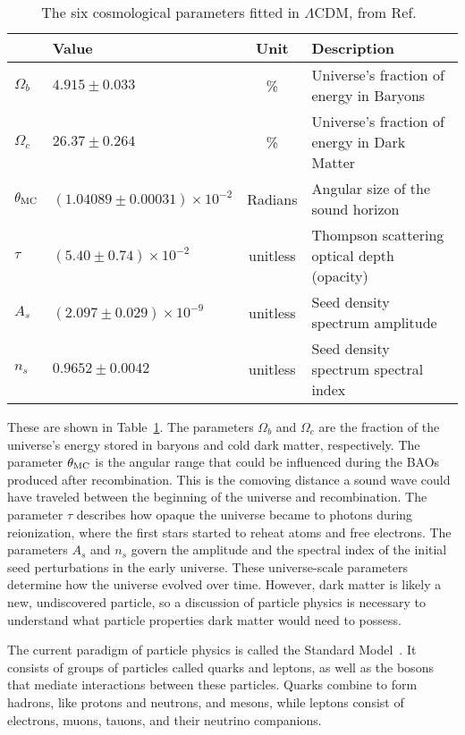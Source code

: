   \begin{table}[]
    \centering
    \caption[6 Cosmological Parameters]{
      The six cosmological parameters fitted in $\Lambda$CDM, from Ref.~\cite{planck_dm_limit}}
    \label{tab:six_params}
    \begin{tabular}{llcl}
               & \textbf{Value}                 & \textbf{Unit} & \textbf{Description} \\
    \hline 
    $\Omega_b$ & $ 4.915  \pm0.033                 $ & \%   & Universe's fraction of energy in Baryons \\
    $\Omega_c$ & $ 26.37  \pm0.264                 $ & \%   & Universe's fraction of energy in Dark Matter \\
    $\theta_{\textrm{MC}}$ & $(1.04089\pm0.00031)\times 10^{-2}$ & Radians  & Angular size of the sound horizon \\
    $\tau$     & $(5.40   \pm0.74   )\times 10^{-2}$ & unitless & Thompson scattering optical depth (opacity)\\
    $A_s$      & $(2.097  \pm0.029  )\times 10^{-9}$ & unitless & Seed density spectrum amplitude \\
    $n_s$      & $ 0.9652 \pm0.0042                $ & unitless & Seed density spectrum spectral index \\
    \hline 
    \end{tabular}
  \end{table}
  
  These are shown in Table~\ref{tab:six_params}.
  The parameters $\Omega_b$ and $\Omega_c$ are the fraction of the universe's energy stored in baryons and cold dark matter, respectively.
  The parameter $\theta_{\textrm{MC}}$ is the angular range that could be influenced during the BAOs produced after recombination.
  This is the comoving distance a sound wave could have traveled between the beginning of the universe and recombination.
  The parameter $\tau$ describes how opaque the universe became to photons during reionization, where the first stars started to reheat atoms and free electrons.
  The parameters $A_s$ and $n_s$ govern the amplitude and the spectral index of the initial seed perturbations in the early universe.
  These universe-scale parameters determine how the universe evolved over time.
  However, dark matter is likely a new, undiscovered particle,  so a discussion of particle physics is necessary to understand what particle properties dark matter would need to possess.
  

  The current paradigm of particle physics is called the Standard Model~\cite{standardmodel}.
  It consists of groups of particles called quarks and leptons, as well as the bosons that mediate interactions between these particles.
  Quarks combine to form hadrons, like protons and neutrons, and mesons, while leptons consist of electrons, muons, tauons, and their neutrino companions.

